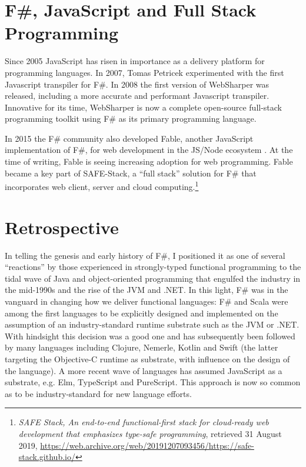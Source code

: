 \documentclass[acmsmall]{acmart}\settopmatter{}
\begin{document}
\section*{F\#, JavaScript and Full Stack Programming}

Since 2005 JavaScript has risen in importance as a delivery platform for programming languages. In 2007, Tomas Petricek
experimented with the first Javascript transpiler for F\#. In 2008 the first version of WebSharper was released, including
a more accurate and performant Javascript transpiler.  Innovative for its time, WebSharper is now a complete
open-source full-stack programming toolkit using F\# as its primary programming language.

In 2015 the F\# community also developed Fable, another JavaScript implementation of F\#, for web development
in the JS/Node ecosystem \citep{GarciaCaro2018}. At the time of writing, Fable is seeing increasing adoption for web
programming.  Fable became a key part of SAFE-Stack, a “full stack” solution for F\# that incorporates web client, server and cloud
computing.\footnote{\textit{SAFE Stack, An end-to-end functional-first stack for cloud-ready web development that emphasizes type-safe programming}, retrieved 31 August 2019,  \url{https://web.archive.org/web/20191207093456/https://safe-stack.github.io/}}


\section*{Retrospective}

In telling the genesis and early history of F\#, I positioned it as one of several “reactions” by those experienced
in strongly-typed functional programming to the tidal wave of Java and object-oriented programming that
engulfed the industry in the mid-1990s and the rise of the JVM and .NET.  In this light, F\# was in the vanguard
in changing how we deliver functional languages: F\# and Scala were among the first languages to be explicitly
designed and implemented on the assumption of an industry-standard runtime substrate such as the JVM or .NET.
With hindsight this decision was a good one and has subsequently been followed by many languages including
Clojure, Nemerle, Kotlin and Swift (the latter targeting the Objective-C runtime as substrate, with influence on the design of the language). A more recent
wave of languages has assumed JavaScript as a substrate, e.g. Elm, TypeScript and PureScript.  This approach is
now so common as to be industry-standard for new language efforts.
\end{document}
